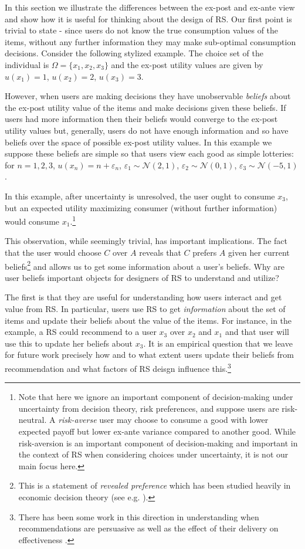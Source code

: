 \documentclass[sigconf]{acmart}
\begin{document}
In this section we illustrate the differences between the ex-post and ex-ante view and show how it is useful for thinking about the design of RS. Our first point is trivial to state - since users do not know the true consumption values of the items, without any further information they may make sub-optimal consumption decisions. Consider the following stylized example. The choice set of the individual is $\Omega= \{x_1, x_2, x_3 \}$ and the ex-post utility values are given by
$u(x_1) = 1$, $u(x_2) = 2$, $u(x_3) = 3$. 
\par
However, when users are making decisions they have unobservable \textit{beliefs} about the ex-post utility value of the items and make decisions given these beliefs. If users had more information then their beliefs would converge to the ex-post utility values but, generally, users do not have enough information and so have beliefs over the space of possible ex-post utility values. In this example we suppose these beliefs are simple so that users view each good as simple lotteries: for $n=1,2,3$, $u(x_n) = n + \varepsilon_n$, $\varepsilon_1 \sim \mathcal N (2, 1)$, $\varepsilon_2 \sim \mathcal N (0, 1)$, $\varepsilon_3 \sim \mathcal N (-5, 1)$.
\par
In this example, after uncertainty is unresolved, the user ought to consume $x_3$, but an expected utility maximizing consumer (without further information) would consume $x_1$.\footnote{Note that here we ignore an important component of decision-making under uncertainty from decision theory, risk preferences, and suppose users are risk-neutral. A \textit{risk-averse} user may choose to consume a good with lower expected payoff but lower ex-ante variance compared to another good. While risk-aversion is an important component of decision-making and important in the context of RS when considering choices under uncertainty, it is not our main focus here.}
\par
This observation, while seemingly trivial, has important implications. The fact that the user would choose $C$ over $A$ reveals that $C$ prefers $A$ given her current beliefs\footnote{This is a statement of \textit{revealed preference} which has been studied heavily in economic decision theory (see e.g. \cite[]{mas1995microeconomic}).} and allows us to get some information about a user's beliefs. Why are user beliefs important objects for designers of RS to understand and utilize?
\par
The first is that they are useful for understanding how users interact and get value from RS. In particular, users use RS to get \textit{information} about the set of items and update their beliefs about the value of the items. For instance, in the example, a RS could recommend to a user $x_3$ over $x_2$ and $x_1$ and that user will use this to update her beliefs about $x_3$. It is an empirical question that we leave for future work precisely how and to what extent users update their beliefs from recommendation and what factors of RS deisgn influence this.\footnote{There has been some work in this direction in understanding when recommendations are persuasive \cite{cremonesi2012investigating, gretzel2006persuasion} as well as the effect of their delivery on effectiveness \cite{murphy2014recommendation}.}
\end{document}
